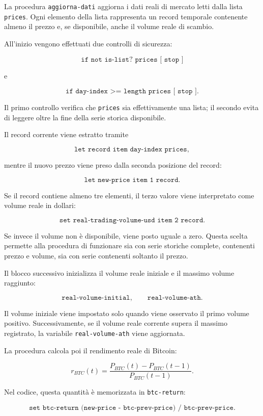 La procedura \texttt{aggiorna-dati} aggiorna i dati reali di mercato letti dalla
lista \texttt{prices}. Ogni elemento della lista rappresenta un record temporale
contenente almeno il prezzo e, se disponibile, anche il volume reale di scambio.

All'inizio vengono effettuati due controlli di sicurezza:

\[
\texttt{if not is-list? prices [ stop ]}
\]

e

\[
\texttt{if day-index >= length prices [ stop ]}.
\]

Il primo controllo verifica che \texttt{prices} sia effettivamente una lista; il
secondo evita di leggere oltre la fine della serie storica disponibile.

Il record corrente viene estratto tramite

\[
\texttt{let record item day-index prices},
\]

mentre il nuovo prezzo viene preso dalla seconda posizione del record:

\[
\texttt{let new-price item 1 record}.
\]

Se il record contiene almeno tre elementi, il terzo valore viene interpretato
come volume reale in dollari:

\[
\texttt{set real-trading-volume-usd item 2 record}.
\]

Se invece il volume non è disponibile, viene posto uguale a zero. Questa scelta
permette alla procedura di funzionare sia con serie storiche complete, contenenti
prezzo e volume, sia con serie contenenti soltanto il prezzo.

Il blocco successivo inizializza il volume reale iniziale e il massimo volume
raggiunto:

\[
\texttt{real-volume-initial},
\qquad
\texttt{real-volume-ath}.
\]

Il volume iniziale viene impostato solo quando viene osservato il primo volume
positivo. Successivamente, se il volume reale corrente supera il massimo
registrato, la variabile \texttt{real-volume-ath} viene aggiornata.

La procedura calcola poi il rendimento reale di Bitcoin:

\[
r_{BTC}(t)
=
\frac{P_{BTC}(t)-P_{BTC}(t-1)}
     {P_{BTC}(t-1)}.
\]

Nel codice, questa quantità è memorizzata in \texttt{btc-return}:

\[
\texttt{set btc-return (new-price - btc-prev-price) / btc-prev-price}.
\]

